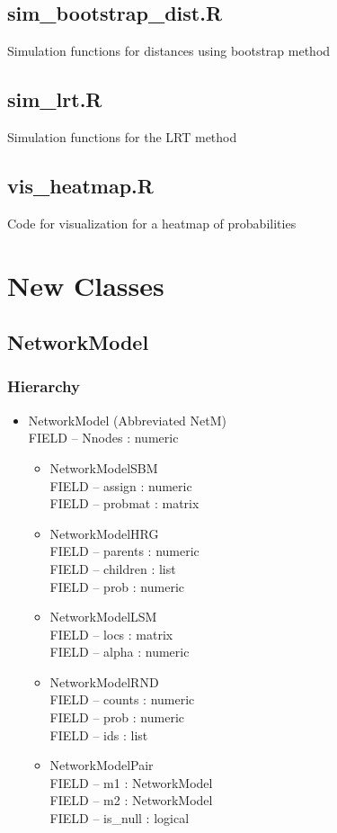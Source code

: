 \documentclass[11pt]{article}
\begin{document}
\subsection{sim\_bootstrap\_dist.R}
Simulation functions for distances using bootstrap method

\subsection{sim\_lrt.R}
Simulation functions for the LRT method

\subsection{vis\_heatmap.R}
Code for visualization for a heatmap of probabilities

\pagebreak
\section{New Classes}
\subsection{NetworkModel}
\subsubsection{Hierarchy}
\begin{itemize}
\item NetworkModel (Abbreviated NetM)\\
FIELD -- Nnodes : numeric
\begin{itemize}
\item NetworkModelSBM\\
FIELD -- assign : numeric \\
FIELD -- probmat : matrix\\
\item NetworkModelHRG\\
FIELD -- parents : numeric\\
FIELD -- children : list\\
FIELD -- prob : numeric\\
\item NetworkModelLSM\\
FIELD -- locs : matrix\\
FIELD -- alpha : numeric\\
\item NetworkModelRND\\
FIELD -- counts : numeric\\
FIELD -- prob : numeric\\
FIELD -- ids : list\\
\item NetworkModelPair\\
FIELD -- m1 : NetworkModel\\
FIELD -- m2 : NetworkModel\\
FIELD -- is\_null : logical\\
\end{itemize}
\end{itemize}
\end{document}
